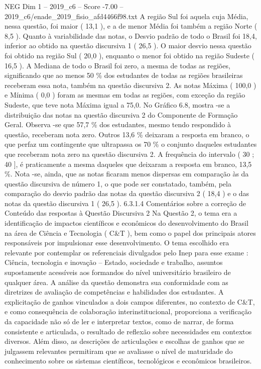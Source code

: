 \begin{textsample}{NEG Dim 1 – 2019\_c6 – Score -7.00 – 2019\_c6/enade\_2019\_fisio\_afd4466f98.txt}
A região Sul foi aquela cuja Média, nessa questão, foi maior ( 13,1 ), e a de menor Média foi também a região Norte ( 8,5 ).
Quanto à variabilidade das notas, o Desvio padrão de todo o Brasil foi 18,4, inferior ao obtido na questão discursiva 1 ( 26,5 ).
O maior desvio nessa questão foi obtido na região Sul ( 20,0 ), enquanto o menor foi obtido na região Sudeste ( 16,5 ).
A Mediana de todo o Brasil foi zero, a mesma de todas as regiões, significando que ao menos 50 \% dos estudantes de todas as regiões brasileiras receberam essa nota, também na questão discursiva 2.
As notas Máxima ( 100,0 ) e Mínima ( 0,0 ) foram as mesmas em todas as regiões, com exceção da região Sudeste, que teve nota Máxima igual a 75,0.
No Gráfico 6.8, mostra -se a distribuição das notas na questão discursiva 2 do Componente de Formação Geral.
Observa -se que 57,7 \% dos estudantes, mesmo tendo respondido à questão, receberam nota zero.
Outros 13,6 \% deixaram a resposta em branco, o que perfaz um contingente que ultrapassa os 70 \% o conjunto daqueles estudantes que receberam nota zero na questão discursiva 2.
A frequência do intervalo ( 30 ; 40 ], é praticamente a mesma daqueles que deixaram a resposta em branco, 13,5 \%.
Nota -se, ainda, que as notas ficaram menos dispersas em comparação às da questão discursiva de número 1, o que pode ser constatado, também, pela comparação do desvio padrão das notas da questão discursiva 2 ( 18,4 ) e o das notas da questão discursiva 1 ( 26,5 ). 6.3.1.4 Comentários sobre a correção de Conteúdo das respostas à Questão Discursiva 2 Na Questão 2, o tema era a identificação de impactos científicos e econômicos do desenvolvimento do Brasil na área de Ciência e Tecnologia ( C\&T ), bem como o papel dos principais atores responsáveis por impulsionar esse desenvolvimento.
O tema escolhido era relevante por contemplar os referenciais divulgados pelo Inep para esse exame : Ciência, tecnologia e inovação – Estado, sociedade e trabalho, assuntos supostamente acessíveis aos formandos do nível universitário brasileiro de qualquer área.
A análise da questão demonstra sua conformidade com as diretrizes de avaliação de competências e habilidades dos estudantes.
A explicitação de ganhos vinculados a dois campos diferentes, no contexto de C\&T, e como consequência de colaboração interinstitucional, proporciona a verificação da capacidade não só de ler e interpretar textos, como de narrar, de forma consistente e articulada, o resultado de reflexão sobre necessidades em contextos diversos.
Além disso, as descrições de articulações e escolhas de ganhos que se julgassem relevantes permitiram que se avaliasse o nível de maturidade do conhecimento sobre os sistemas científicos, tecnológicos e econômicos brasileiros.

\end{textsample}
